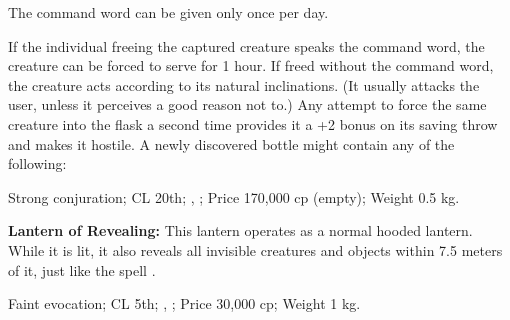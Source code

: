 The command word can be given only once per day.

If the individual freeing the captured creature speaks the command word, the creature can be forced to serve for 1 hour. If freed without the command word, the creature acts according to its natural inclinations. (It usually attacks the user, unless it perceives a good reason not to.) Any attempt to force the same creature into the flask a second time provides it a +2 bonus on its saving throw and makes it hostile. A newly discovered bottle might contain any of the following:


Strong conjuration; CL 20th; , ; Price 170,000 cp (empty); Weight 0.5 kg.



\textbf{Lantern of Revealing:} This lantern operates as a normal hooded lantern. While it is lit, it also reveals all invisible creatures and objects within 7.5 meters of it, just like the spell .

Faint evocation; CL 5th; , ; Price 30,000 cp; Weight 1 kg.



